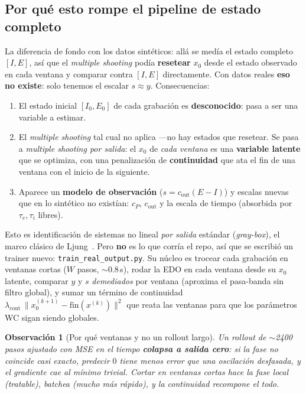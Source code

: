 \documentclass[11pt,a4paper]{article}
\newtheorem{remark}{Observación}
\begin{document}
\subsection*{Por qué esto rompe el pipeline de estado completo}
La diferencia de fondo con los datos sintéticos: allá se medía el estado completo $[I,E]$, así que el \emph{multiple shooting} podía \textbf{resetear} $x_0$ desde el estado observado en cada ventana y comparar contra $[I,E]$ directamente. Con datos reales \textbf{eso no existe}: solo tenemos el escalar $s\approx y$. Consecuencias:
\begin{enumerate}[leftmargin=1.6em]
  \item El estado inicial $[I_0, E_0]$ de cada grabación es \textbf{desconocido}: pasa a ser una variable a estimar.
  \item El \emph{multiple shooting} tal cual no aplica ---no hay estados que resetear. Se pasa a \emph{multiple shooting por salida}: el $x_0$ de \emph{cada ventana} es una \textbf{variable latente} que se optimiza, con una penalización de \textbf{continuidad} que ata el fin de una ventana con el inicio de la siguiente.
  \item Aparece un \textbf{modelo de observación} ($s = c_{\text{out}}(E-I)$) y escalas nuevas que en lo sintético no existían: $c_P$, $c_{\text{out}}$ y la escala de tiempo (absorbida por $\tau_e,\tau_i$ libres).
\end{enumerate}
Esto es identificación de sistemas no lineal \emph{por salida} estándar (\emph{gray-box}), el marco clásico de Ljung~\cite{ljung}. Pero \textbf{no} es lo que corría el repo, así que se escribió un trainer nuevo: \texttt{train\_real\_output.py}. Su núcleo es trocear cada grabación en ventanas cortas ($W$ pasos, $\sim$0.8\,s), rodar la EDO en cada ventana desde su $x_0$ latente, comparar $y$ y $s$ \emph{demediados} por ventana (aproxima el pasa-banda sin filtro global), y sumar un término de continuidad $\lambda_{\text{cont}}\,\|x_0^{(k+1)} - \text{fin}(x^{(k)})\|^2$ que reata las ventanas para que los parámetros WC sigan siendo globales.

\begin{remark}[Por qué ventanas y no un rollout largo]
Un \emph{rollout} de $\sim$2400 pasos ajustado con MSE en el tiempo \textbf{colapsa a salida cero}: si la fase no coincide casi exacto, predecir $0$ tiene \emph{menos} error que una oscilación desfasada, y el gradiente cae al mínimo trivial. Cortar en ventanas cortas hace la fase local (tratable), batchea (mucho más rápido), y la continuidad recompone el todo.
\end{remark}
\end{document}
